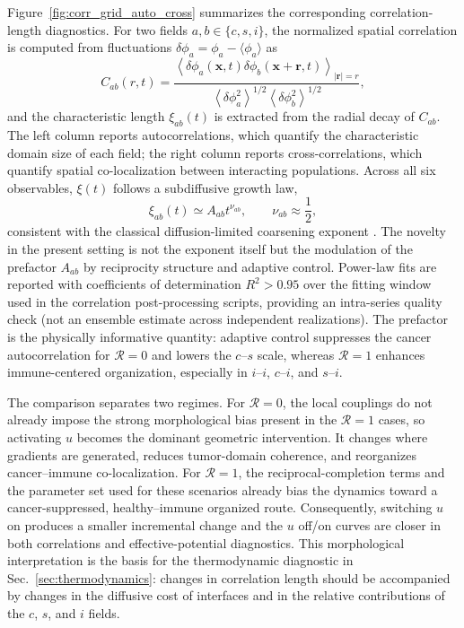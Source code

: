 Figure~\ref{fig:corr_grid_auto_cross} summarizes the corresponding correlation-length diagnostics. For two fields $a,b\in\{c,s,i\}$, the normalized spatial correlation is computed from fluctuations $\delta\phi_a=\phi_a-\langle\phi_a\rangle$ as
\begin{equation}
    C_{ab}(r,t)=
    \frac{\left\langle \delta\phi_a(\mathbf{x},t)
    \delta\phi_b(\mathbf{x}+\mathbf{r},t)\right\rangle_{|\mathbf{r}|=r}}
    {\left\langle \delta\phi_a^2\right\rangle^{1/2}
     \left\langle \delta\phi_b^2\right\rangle^{1/2}},
    \label{eq:correlation-function}
\end{equation}
and the characteristic length $\xi_{ab}(t)$ is extracted from the radial decay of $C_{ab}$. The left column reports autocorrelations, which quantify the characteristic domain size of each field; the right column reports cross-correlations, which quantify spatial co-localization between interacting populations. Across all six observables, $\xi(t)$ follows a subdiffusive growth law,
\begin{equation}
    \xi_{ab}(t)\simeq A_{ab}t^{\nu_{ab}},
    \qquad \nu_{ab}\approx \frac{1}{2},
    \label{eq:correlation-scaling}
\end{equation}
consistent with the classical diffusion-limited coarsening exponent \cite{bray1994}. The novelty in the present setting is not the exponent itself but the modulation of the prefactor $A_{ab}$ by reciprocity structure and adaptive control. Power-law fits are reported with coefficients of determination $R^2>0.95$ over the fitting window used in the correlation post-processing scripts, providing an intra-series quality check (not an ensemble estimate across independent realizations). The prefactor is the physically informative quantity: adaptive control suppresses the cancer autocorrelation for $\mathcal{R}=0$ and lowers the $c$--$s$ scale, whereas $\mathcal{R}=1$ enhances immune-centered organization, especially in $i$--$i$, $c$--$i$, and $s$--$i$.

The comparison separates two regimes. For $\mathcal{R}=0$, the local couplings do not already impose the strong morphological bias present in the $\mathcal{R}=1$ cases, so activating $u$ becomes the dominant geometric intervention. It changes where gradients are generated, reduces tumor-domain coherence, and reorganizes cancer--immune co-localization. For $\mathcal{R}=1$, the reciprocal-completion terms and the parameter set used for these scenarios already bias the dynamics toward a cancer-suppressed, healthy--immune organized route. Consequently, switching $u$ on produces a smaller incremental change and the $u$ off/on curves are closer in both correlations and effective-potential diagnostics. This morphological interpretation is the basis for the thermodynamic diagnostic in Sec.~\ref{sec:thermodynamics}: changes in correlation length should be accompanied by changes in the diffusive cost of interfaces and in the relative contributions of the $c$, $s$, and $i$ fields.

